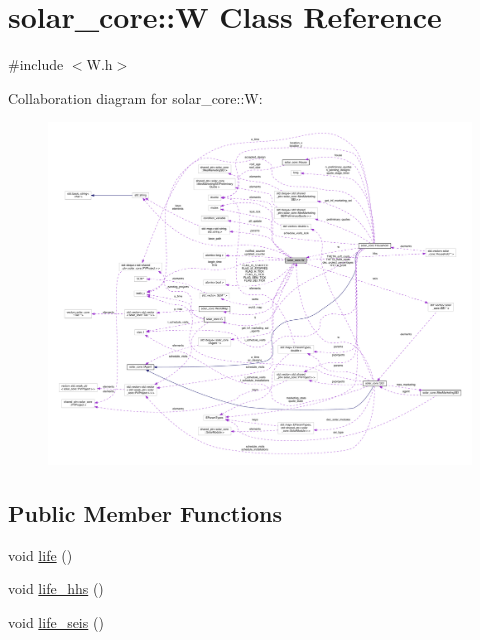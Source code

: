 \hypertarget{classsolar__core_1_1_w}{}\section{solar\+\_\+core\+:\+:W Class Reference}
\label{classsolar__core_1_1_w}


{\ttfamily \#include $<$W.\+h$>$}



Collaboration diagram for solar\+\_\+core\+:\+:W\+:
\nopagebreak
\begin{figure}[H]
\begin{center}
\leavevmode
\includegraphics[width=350pt]{classsolar__core_1_1_w__coll__graph}
\end{center}
\end{figure}
\subsection*{Public Member Functions}
{\bf }\par
\begin{DoxyCompactItemize}
\item 
void \hyperlink{classsolar__core_1_1_w_a5e64e5a7ef41c07fddf7994cd3f2693e}{life} ()
\item 
void \hyperlink{classsolar__core_1_1_w_a08283dbea7c7f3fe8b7f094a96f73a78}{life\+\_\+hhs} ()
\item 
void \hyperlink{classsolar__core_1_1_w_a77b206056c9440059f7b78e1424b0921}{life\+\_\+seis} ()
\end{DoxyCompactItemize}

